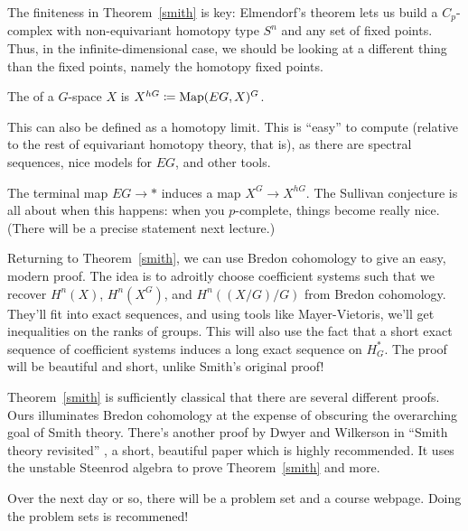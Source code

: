 The finiteness in Theorem~\ref{smith} is key: Elmendorf's theorem lets us build a $C_p$-complex with
non-equivariant homotopy type $S^n$ and any set of fixed points. Thus, in the infinite-dimensional case, we should
be looking at a different thing than the fixed points, namely the homotopy fixed points.
\begin{defn}
The  of a $G$-space $X$ is $X^{hG}\coloneqq \operatorname{Map}(EG, X)^G$.
\end{defn}
This can also be defined as a homotopy limit. This is ``easy'' to compute (relative to the rest of equivariant
homotopy theory, that is), as there are spectral sequences, nice models for $EG$, and other tools.

The terminal map $EG\to *$ induces a map $X^G\to X^{hG}$. The Sullivan conjecture is all about when this happens:
when you $p$-complete, things become really nice. (There will be a precise statement next lecture.)

Returning to Theorem~\ref{smith}, we can use Bredon cohomology to give an easy, modern proof. The idea is to
adroitly choose coefficient systems such that we recover $H^n(X)$, $H^n(X^G)$, and $H^n((X/G)/G)$ from Bredon
cohomology. They'll fit into exact sequences, and using tools like Mayer-Vietoris, we'll get inequalities on the
ranks of groups. This will also use the fact that a short exact sequence of coefficient systems induces a long
exact sequence on $H_G^*$. The proof will be beautiful and short, unlike Smith's original proof!

Theorem~\ref{smith} is sufficiently classical that there are several different proofs. Ours illuminates Bredon
cohomology at the expense of obscuring the overarching goal of Smith theory. There's another proof by Dwyer and
Wilkerson in ``Smith theory revisited'' \cite{SmithRevisit}, a short, beautiful paper which is highly recommended. It uses the unstable
Steenrod algebra to prove Theorem~\ref{smith} and more.

Over the next day or so, there will be a problem set and a course webpage. Doing the problem sets is recommened!

